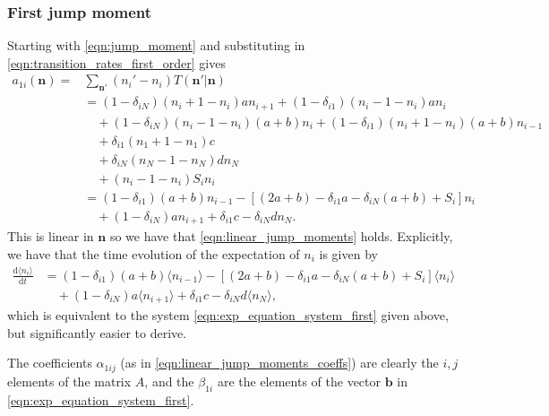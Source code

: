 \documentclass[a4paper,11pt]{article}
\numberwithin{equation}{section}
\newcommand{\diff}[2]{\frac{\mathrm{d} #1}{\mathrm{d} #2}}
\newcommand{\V}[1]{\mathbf{#1}}
\newcommand{\E}[1]{\langle #1 \rangle}
\begin{document}
\subsubsection{First jump moment}
Starting with \eqref{eqn:jump_moment} and substituting in
\eqref{eqn:transition_rates_first_order} gives
\begin{equation}
    \begin{aligned}
        a_{1i}(\V{n}) =& \sum_{\V{n}'} (n_i' - n_i) T(\V{n}' | \V{n})\\
        &= (1-\delta_{iN})(n_i + 1 - n_i)a n_{i+1}
        +  (1-\delta_{i1})(n_i - 1 - n_i)a n_i\\
        &\quad+ (1-\delta_{iN})(n_i - 1 - n_i)(a+b) n_i
        +  (1-\delta_{i1})(n_i + 1 - n_i)(a+b) n_{i-1}\\
        &\quad+ \delta_{i1}(n_1 + 1 - n_1) c\\
        &\quad+ \delta_{iN}(n_N - 1 - n_N) d n_N\\
        &\quad+ (n_i - 1 - n_i) S_i n_i\\
        &= (1-\delta_{i1})(a+b)n_{i-1} - \left[(2a+b) - \delta_{i1}a -
        \delta_{iN}(a+b) + S_i\right]n_i\\
        &\quad+ (1-\delta_{iN})an_{i+1} + \delta_{i1}c - \delta_{iN}d n_N.
    \end{aligned}
    \label{eqn:first_jump_mom_first_order}
\end{equation}
This is linear in \(\V{n}\) so we have that \eqref{eqn:linear_jump_moments}
holds. Explicitly, we have that the time evolution of the expectation of \(n_i\)
is given by
\begin{equation}
    \begin{aligned}
        \diff{\E{n_i}}{t} &= (1-\delta_{i1})(a+b)\E{n_{i-1}} - \left[(2a+b) -
        \delta_{i1}a - \delta_{iN}(a+b) + S_i\right]\E{n_i}\\
        &\quad+(1-\delta_{iN})a\E{n_{i+1}} + \delta_{i1}c - \delta_{iN}d \E{n_N},
    \end{aligned}
\end{equation}
which is equivalent to the system \eqref{eqn:exp_equation_system_first} given
above, but significantly easier to derive.

The coefficients \(\alpha_{1ij}\) (as in \eqref{eqn:linear_jump_moments_coeffs})
are clearly the \(i,j\) elements of the matrix \(A\), and the \(\beta_{1i}\) are the
elements of the vector \(\V{b}\) in \eqref{eqn:exp_equation_system_first}.
\end{document}
